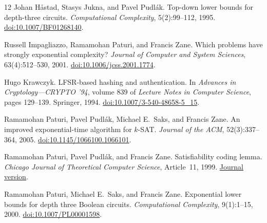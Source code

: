 \begin{thebibliography}{12}
Johan H\aa stad, Stasys Jukna, and Pavel Pudl\'ak.
\newblock Top-down lower bounds for depth-three circuits.
\newblock \emph{Computational Complexity}, 5(2):99--112, 1995.
\newblock \href{https://doi.org/10.1007/BF01268140}
{doi:10.1007/BF01268140}.

Russell Impagliazzo, Ramamohan Paturi, and Francis Zane.
\newblock Which problems have strongly exponential complexity?
\newblock \emph{Journal of Computer and System Sciences}, 63(4):512--530, 2001.
\newblock \href{https://doi.org/10.1006/jcss.2001.1774}
{doi:10.1006/jcss.2001.1774}.

Hugo Krawczyk.
\newblock LFSR-based hashing and authentication.
\newblock In \emph{Advances in Cryptology---CRYPTO '94}, volume 839 of
\emph{Lecture Notes in Computer Science}, pages 129--139. Springer, 1994.
\newblock \href{https://doi.org/10.1007/3-540-48658-5_15}
{doi:10.1007/3-540-48658-5\_15}.

Ramamohan Paturi, Pavel Pudl\'ak, Michael E.~Saks, and Francis Zane.
\newblock An improved exponential-time algorithm for $k$-SAT.
\newblock \emph{Journal of the ACM}, 52(3):337--364, 2005.
\newblock \href{https://doi.org/10.1145/1066100.1066101}
{doi:10.1145/1066100.1066101}.

Ramamohan Paturi, Pavel Pudl\'ak, and Francis Zane.
\newblock Satisfiability coding lemma.
\newblock \emph{Chicago Journal of Theoretical Computer Science},
Article~11, 1999.
\newblock \href{https://scholar.lib.vt.edu/ejournals/CJTCS/cjtcs-mirror/articles/1999/11/contents.html}
{Journal version}.

Ramamohan Paturi, Michael E.~Saks, and Francis Zane.
\newblock Exponential lower bounds for depth three Boolean circuits.
\newblock \emph{Computational Complexity}, 9(1):1--15, 2000.
\newblock \href{https://doi.org/10.1007/PL00001598}
{doi:10.1007/PL00001598}.

\end{thebibliography}
